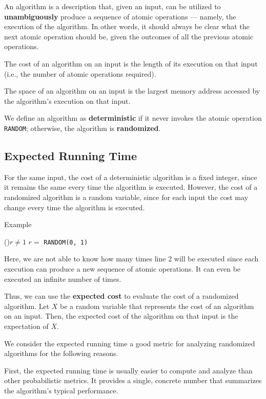 An algorithm is a description that, given an input, can be utilized to \textbf{unambiguously} produce a sequence of atomic operations — namely, the execution of the algorithm. In other words, it should always be clear what the next atomic operation should be, given the outcomes of all the previous atomic operations.

The cost of an algorithm on an input is the length of its execution on that input (i.e., the number of atomic operations required).

The space of an algorithm on an input is the largest memory address accessed by the algorithm’s execution on that input.

We define an algorithm as \textbf{deterministic} if it never invokes the atomic operation \texttt{RANDOM}; otherwise, the algorithm is \textbf{randomized}. 

\subsection{Expected Running Time}
For the same input, the cost of a deterministic algorithm is a fixed integer, since it remains the same every time the algorithm is executed. However, the cost of a randomized algorithm is a random variable, since for each input the cost may change every time the algorithm is executed. 

\begin{algorithm}[H]
	\DontPrintSemicolon{}
	\caption{Example}
	\BlankLine
	\While(){\(r \neq 1\)}{
		\(r = \) \texttt{RANDOM(0, 1)}
	}
	\;
\end{algorithm}

Here, we are not able to know how many times line 2 will be executed since each execution can produce a new sequence of atomic operations. It can even be executed an infinite number of times.

Thus, we can use the \textbf{expected cost} to evaluate the cost of a randomized algorithm. Let \(X\) be a random variable that represents the cost of an algorithm on an input. Then, the expected cost of the algorithm on that input is the expectation of \(X\). 

We consider the expected running time a good metric for analyzing randomized algorithms for the following reasons. 

First, the expected running time is usually easier to compute and analyze than other probabilistic metrics. It provides a single, concrete number that summarizes the algorithm’s typical performance. 

